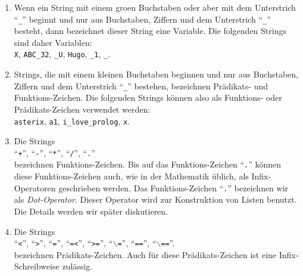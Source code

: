 \begin{enumerate}
\item Wenn ein String mit einem gro\3en Buchstaben oder aber mit dem Unterstrich
      ``\texttt{\_}'' beginnt und nur aus Buchstaben, Ziffern und dem Unterstrich
      ``\texttt{\_}'' besteht, dann bezeichnet dieser String eine Variable.
      Die folgenden Strings sind daher Variablen: 
      \\[0.2cm]
      \hspace*{1.3cm} \texttt{X}, \texttt{ABC\_32}, \texttt{\_U}, \texttt{Hugo},
      \texttt{\_1}, \texttt{\_}.
\item Strings, die mit einem kleinen Buchstaben beginnen und nur aus Buchstaben, Ziffern
      und dem Unterstrich ``\texttt{\_}'' bestehen, bezeichnen Pr\"{a}dikats- und Funktions-Zeichen.
      Die folgenden Strings k\"{o}nnen also als Funktions- oder Pr\"{a}dikats-Zeichen
      verwendet werden:
      \\[0.2cm]
      \hspace*{1.3cm}      
      \texttt{asterix}, \texttt{a1}, \texttt{i\_love\_prolog}, \texttt{x}.
\item Die Strings \\[0.2cm]
      \hspace*{1.3cm} 
      ``\texttt{+}'',
      ``\texttt{-}'',
      ``\texttt{*}'',
      ``\texttt{/}'',
      ``\texttt{.}'' \\[0.2cm]
      bezeichnen Funktions-Zeichen.  Bis auf das Funktions-Zeichen ``\texttt{.}''
      k\"{o}nnen diese Funktions-Zeichen auch, wie in der Mathematik \"{u}blich,
      als Infix-Operatoren geschrieben werden.  Das Funktions-Zeichen ``\texttt{.}''
      bezeichnen wir als \emph{Dot-Operator}.  Dieser Operator wird zur Konstruktion von
      Listen benutzt.  Die Details werden wir sp\"{a}ter diskutieren.
\item Die Strings \\[0.2cm]
      \hspace*{1.3cm} 
      ``\texttt{<}'',
      ``\texttt{>}'',
      ``\texttt{=}'',
      ``\texttt{=<}'',
      ``\texttt{>=}'',  
      ``\texttt{$\backslash$=}'', 
      ``\texttt{==}'',
      ``\texttt{$\backslash$==}''.
      \\[0.2cm]
      bezeichnen Pr\"{a}dikats-Zeichen. Auch f\"{u}r diese Pr\"{a}dikats-Zeichen ist eine
      Infix-Schreibweise zul\"{a}ssig.
      

\end{enumerate}
